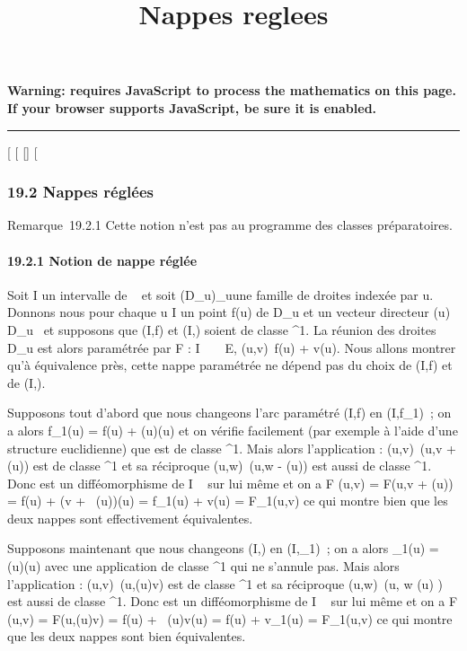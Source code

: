 \documentclass[]{article}
\title{Nappes reglees}
\author{}
\date{}
\begin{document}
\maketitle

\textbf{Warning: 
requires JavaScript to process the mathematics on this page.\\ If your
browser supports JavaScript, be sure it is enabled.}

\begin{center}\rule{3in}{0.4pt}\end{center}

{[}
{[}
{[}{]}
{[}

\subsubsection{19.2 Nappes réglées}

Remarque~19.2.1 Cette notion n'est pas au programme des classes
préparatoires.

\paragraph{19.2.1 Notion de nappe réglée}

Soit I un intervalle de ~ et soit (D_u)_u\inI une
famille de droites indexée par u. Donnons nous pour chaque u \in I un
point f(u) de D_u et un vecteur directeur
\vecg(u) \in\overrightarrow
D_u \diagdown\0\ et supposons que
(I,f) et (I,\vecg) soient de classe ^1.
La réunion des droites D_u est alors paramétrée par F : I \times {}~ \rightarrow~
E, (u,v)\mapsto~f(u) + v\vecg(u).
Nous allons montrer qu'à équivalence près, cette nappe paramétrée ne
dépend pas du choix de (I,f) et de (I,\vecg).

Supposons tout d'abord que nous changeons l'arc paramétré (I,f) en
(I,f_1)~; on a alors f_1(u) = f(u) +
\phi(u)\vecg(u) et on vérifie facilement (par exemple à
l'aide d'une structure euclidienne) que \phi est de classe ^1.
Mais alors l'application \theta : (u,v)\mapsto~(u,v +
\phi(u)) est de classe ^1 et sa réciproque
(u,w)\mapsto~(u,w - \phi(u)) est aussi de classe
^1. Donc \theta est un difféomorphisme de I \times {}~ sur lui même et
on a F \cdot \theta(u,v) = F(u,v + \phi(u)) = f(u) + (v +
\alpha~(u))\vecg(u) = f_1(u) +
v\vecg(u) = F_1(u,v) ce qui montre bien que
les deux nappes sont effectivement équivalentes.

Supposons maintenant que nous changeons (I,\vecg) en
(I,\vecg_1)~; on a alors
\vecg_1(u) = \psi(u)\vecg(u)
avec une application \psi de classe ^1 qui ne s'annule pas.
Mais alors l'application \theta : (u,v)\mapsto~(u,\psi(u)v)
est de classe ^1 et sa réciproque
(u,w)\mapsto~(u, w \over \psi(u) )
est aussi de classe ^1. Donc \theta est un difféomorphisme de I \times
{}~ sur lui même et on a F \cdot \theta(u,v) = F(u,\psi(u)v) = f(u) +
\beta~(u)v\vecg(u) = f(u) +
v\vecg_1(u) = F_1(u,v) ce qui
montre que les deux nappes sont bien équivalentes.
\end{document}
